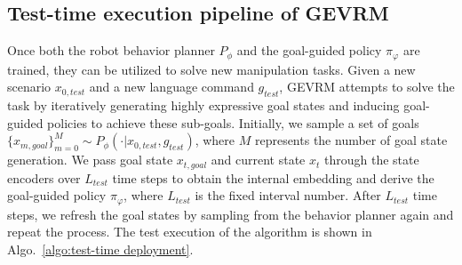 \subsection{Test-time execution pipeline of GEVRM}
\label{subsection:Test-time execution pipeline}
Once both the robot behavior planner $P_{\phi}$ and the goal-guided policy $\pi_{\varphi}$ are trained, they can be utilized to solve new manipulation tasks.
Given a new scenario $ x_{0,test}$ and a new language command $ g_{test}$, GEVRM attempts to solve the task by iteratively generating highly expressive goal states and inducing goal-guided policies to achieve these sub-goals. 
Initially, we sample a set of goals $\{x_{m,goal}\}_{m=0}^{M}\sim P_{\phi}(\cdot| x_{0,test}, g_{test})$, where $M$ represents the number of goal state generation.
We pass goal state $x_{t,goal}$ and current state $x_{t}$ through the state encoders over $L_{test}$ time steps to obtain the internal embedding and derive the goal-guided policy $\pi_{\varphi}$, where $L_{test}$ is the fixed interval number. 
After $L_{test}$ time steps, we refresh the goal states by sampling from the behavior planner again and repeat the process. 
The test execution of the algorithm is shown in Algo.~\ref{algo:test-time deployment}.
